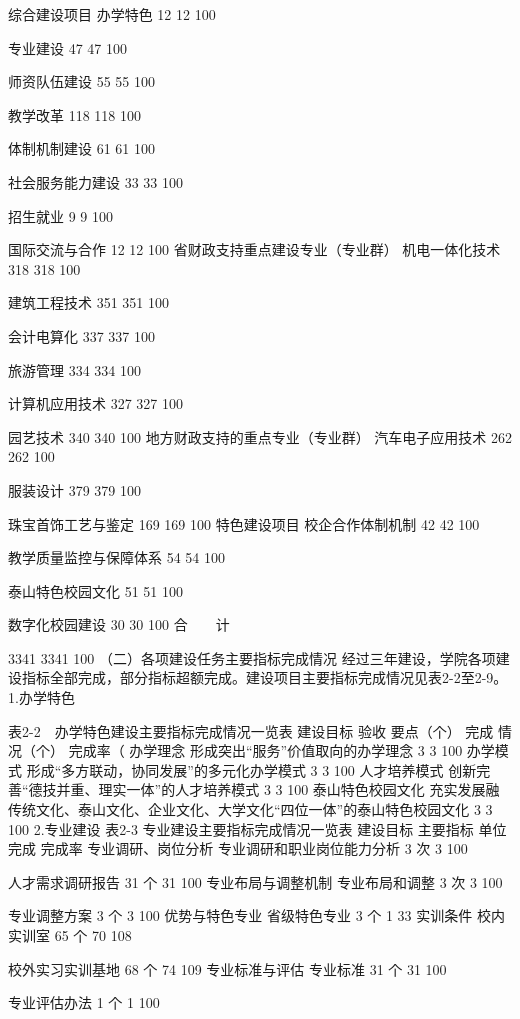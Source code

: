 综合建设项目
办学特色
12
12
100%

专业建设
47
47
100%

师资队伍建设
55
55
100%

教学改革
118
118
100%

体制机制建设
61
61
100%

社会服务能力建设
33
33
100%

招生就业
9
9
100%

国际交流与合作
12
12
100%
省财政支持重点建设专业（专业群）
机电一体化技术
318
318
100%

建筑工程技术
351
351
100%

会计电算化
337
337
100%

旅游管理
334
334
100%

计算机应用技术
327
327
100%

园艺技术
340
340
100%
地方财政支持的重点专业（专业群）
汽车电子应用技术
262
262
100%

服装设计
379
379
100%

珠宝首饰工艺与鉴定
169
169
100%
特色建设项目
校企合作体制机制
42
42
100%

教学质量监控与保障体系
54
54
100%

泰山特色校园文化
51
51
100%

数字化校园建设
30
30
100%
合　　计

3341
3341
100%
（二）各项建设任务主要指标完成情况
经过三年建设，学院各项建设指标全部完成，部分指标超额完成。建设项目主要指标完成情况见表2-2至2-9。
1.办学特色






表2-2　办学特色建设主要指标完成情况一览表
建设目标
验收
要点（个）
完成
情况（个）
完成率（%
办学理念
形成突出“服务”价值取向的办学理念
3
3
100%
办学模式
形成“多方联动，协同发展”的多元化办学模式
3
3
100%
人才培养模式
创新完善“德技并重、理实一体”的人才培养模式
3
3
100%
泰山特色校园文化
充实发展融传统文化、泰山文化、企业文化、大学文化“四位一体”的泰山特色校园文化
3
3
100%
2.专业建设
表2-3  专业建设主要指标完成情况一览表
建设目标
主要指标
单位
完成
完成率
专业调研、岗位分析
专业调研和职业岗位能力分析
3
次
3
100%

人才需求调研报告
31
个
31
100%
专业布局与调整机制
专业布局和调整
3
次
3
100%

专业调整方案
3
个
3
100%
优势与特色专业
省级特色专业
3
个
1
33%
实训条件
校内实训室
65
个
70
108%

校外实习实训基地
68
个
74
109%
专业标准与评估
专业标准
31
个
31
100%

专业评估办法
1
个
1
100%

